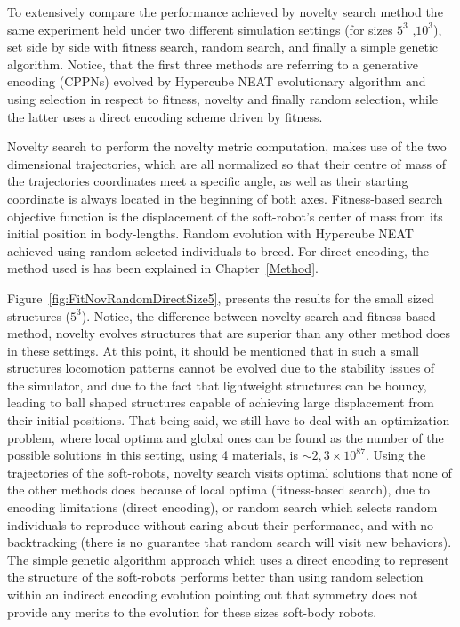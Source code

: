 To extensively compare the performance achieved by novelty search method the same experiment held under two different simulation settings (for sizes $5^3$ ,$10^3$), set side by side with fitness search, random search, and finally a simple genetic algorithm. Notice, that the first three methods are referring to a generative encoding (CPPNs) evolved by Hypercube NEAT evolutionary algorithm and using selection in respect to fitness, novelty and finally random selection, while the latter uses a direct encoding scheme driven by fitness. 

Novelty search to perform the novelty metric computation, makes use of the two dimensional trajectories, which are all normalized so that their centre of mass of the trajectories coordinates meet a specific angle, as well as their starting coordinate is always located in the beginning of both axes. Fitness-based search objective function is the displacement of the soft-robot's center of mass from its initial position in body-lengths. Random evolution with Hypercube NEAT achieved using random selected individuals to breed. For direct encoding, the method used is has been explained in Chapter~\ref{Method}. 

Figure~\ref{fig:FitNovRandomDirectSize5}, presents the results for the small sized structures ($5^3$). Notice, the difference between novelty search and fitness-based method, novelty evolves structures that are superior than any other method does in these settings. At this point, it should be mentioned that in such a small structures locomotion patterns cannot be evolved due to the stability issues of the simulator, and due to the fact that lightweight structures can be bouncy, leading to ball shaped structures capable of achieving large displacement from their initial positions. That being said, we still have to deal with an optimization problem, where local optima and global ones can be found as the number of the possible solutions in this setting, using 4 materials, is $\sim 2,3 \times 10^{87}$. Using the trajectories of the soft-robots, novelty search visits optimal solutions that none of the other methods does because of local optima (fitness-based search), due to encoding limitations (direct encoding), or random search which selects random individuals to reproduce without caring about their performance, and with no backtracking (there is no guarantee that random search will visit new behaviors). The simple genetic algorithm approach which uses a direct encoding to represent the structure of the soft-robots performs better than using random selection within an indirect encoding evolution pointing out that symmetry does not provide any merits to the evolution for these sizes soft-body robots.

